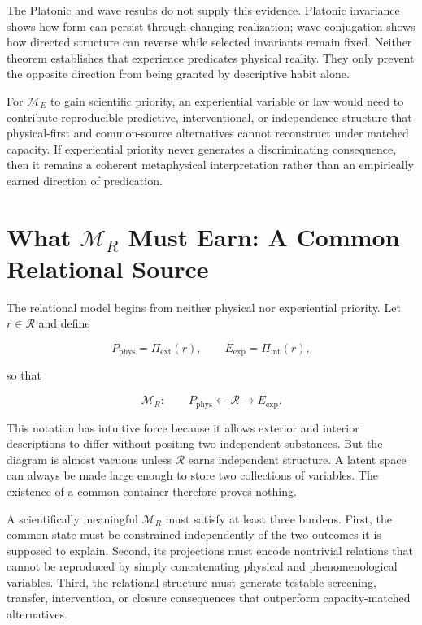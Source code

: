 The Platonic and wave results do not supply this evidence. Platonic invariance shows how form can persist through changing realization; wave conjugation shows how directed structure can reverse while selected invariants remain fixed. Neither theorem establishes that experience predicates physical reality. They only prevent the opposite direction from being granted by descriptive habit alone.

For $\mathcal M_E$ to gain scientific priority, an experiential variable or law would need to contribute reproducible predictive, interventional, or independence structure that physical-first and common-source alternatives cannot reconstruct under matched capacity. If experiential priority never generates a discriminating consequence, then it remains a coherent metaphysical interpretation rather than an empirically earned direction of predication.

\section{What $\mathcal M_R$ Must Earn: A Common Relational Source}

The relational model begins from neither physical nor experiential priority. Let $r\in\mathscr R$ and define

\[
P_{\mathrm{phys}}=\Pi_{\mathrm{ext}}(r),
\qquad
E_{\mathrm{exp}}=\Pi_{\mathrm{int}}(r),
\]

so that

\[
\mathcal M_R:\qquad
P_{\mathrm{phys}}\longleftarrow\mathscr R\longrightarrow E_{\mathrm{exp}}.
\]

This notation has intuitive force because it allows exterior and interior descriptions to differ without positing two independent substances. But the diagram is almost vacuous unless $\mathscr R$ earns independent structure. A latent space can always be made large enough to store two collections of variables. The existence of a common container therefore proves nothing.

A scientifically meaningful $\mathcal M_R$ must satisfy at least three burdens. First, the common state must be constrained independently of the two outcomes it is supposed to explain. Second, its projections must encode nontrivial relations that cannot be reproduced by simply concatenating physical and phenomenological variables. Third, the relational structure must generate testable screening, transfer, intervention, or closure consequences that outperform capacity-matched alternatives.

